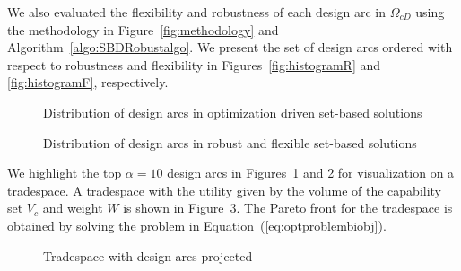 We also evaluated the flexibility and robustness of each design arc in $\Omega_{cD}$ using the methodology in Figure~\ref{fig:methodology} and Algorithm~\ref{algo:SBDRobustalgo}. We present the set of design arcs ordered with respect to robustness and flexibility in Figures~\ref{fig:histogramR} and \ref{fig:histogramF}, respectively.

\begin{figure}[h!]
	\centering
	 \hspace{0.1\textwidth}%
	 \hspace{0.1\textwidth}%
	\caption{Distribution of design arcs in optimization driven set-based solutions}
	\label{fig:histogramplotsSBD}
\end{figure}

\begin{figure}[h!]
	\centering
	 \hspace{0.1\textwidth}%
	 \hspace{0.1\textwidth}%
	\caption{Distribution of design arcs in robust and flexible set-based solutions}
	\label{fig:histogramplots}
\end{figure}

We highlight the top $\alpha = 10$ design arcs in Figures~\ref{fig:histogramplotsSBD} and \ref{fig:histogramplots} for visualization on a tradespace. A tradespace with the utility given by the volume of the capability set $V_c$ and weight $W$ is shown in Figure~\ref{fig:tradespaceSBD}. The Pareto front for the tradespace is obtained by solving the problem in Equation~(\ref{eq:optproblembiobj}).

\begin{figure}[h!]
	\centering
	 \hspace{0.1\textwidth}%
	 \hspace{0.1\textwidth}%
	\caption{Tradespace with design arcs projected}
	\label{fig:tradespaceSBD}
\end{figure}


